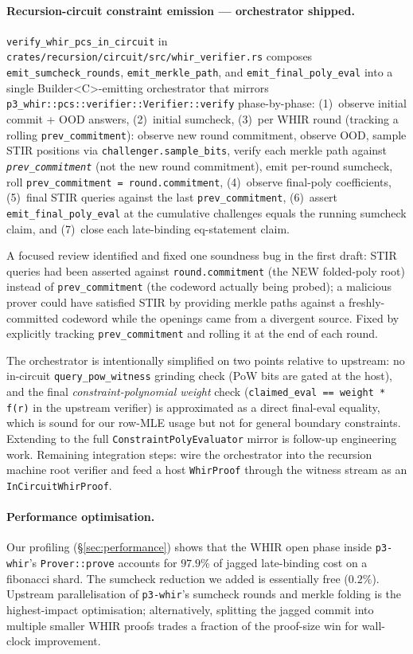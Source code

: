 \paragraph{Recursion-circuit constraint emission --- orchestrator
shipped.}  \texttt{verify\_whir\_pcs\_in\_circuit} in
\texttt{crates/recursion/circuit/src/whir\_verifier.rs} composes
\texttt{emit\_sumcheck\_rounds}, \texttt{emit\_merkle\_path}, and
\texttt{emit\_final\_poly\_eval} into a single Builder<C>-emitting
orchestrator that mirrors
\texttt{p3\_whir::pcs::verifier::Verifier::verify} phase-by-phase:
(1)~observe initial commit + OOD answers,
(2)~initial sumcheck,
(3)~per WHIR round (tracking a rolling \texttt{prev\_commitment}):
observe new round commitment, observe OOD, sample STIR positions
via \texttt{challenger.sample\_bits}, verify each merkle path
against \emph{\texttt{prev\_commitment}} (not the new round
commitment), emit per-round sumcheck, roll \texttt{prev\_commitment
= round.commitment},
(4)~observe final-poly coefficients,
(5)~final STIR queries against the last \texttt{prev\_commitment},
(6)~assert \texttt{emit\_final\_poly\_eval} at the cumulative
challenges equals the running sumcheck claim, and
(7)~close each late-binding eq-statement claim.

A focused review identified and fixed one soundness bug in the
first draft: STIR queries had been asserted against
\texttt{round.commitment} (the NEW folded-poly root) instead of
\texttt{prev\_commitment} (the codeword actually being probed); a
malicious prover could have satisfied STIR by providing merkle
paths against a freshly-committed codeword while the openings came
from a divergent source.  Fixed by explicitly tracking
\texttt{prev\_commitment} and rolling it at the end of each round.

The orchestrator is intentionally simplified on two points relative
to upstream: no in-circuit \texttt{query\_pow\_witness} grinding
check (PoW bits are gated at the host), and the final
\emph{constraint-polynomial weight} check (\texttt{claimed\_eval
== weight * f(r)} in the upstream verifier) is approximated as a
direct final-eval equality, which is sound for our row-MLE usage
but not for general boundary constraints.  Extending to the full
\texttt{ConstraintPolyEvaluator} mirror is follow-up engineering
work.  Remaining integration steps: wire the orchestrator into the
recursion machine root verifier and feed a host \texttt{WhirProof}
through the witness stream as an \texttt{InCircuitWhirProof}.

\paragraph{Performance optimisation.}  Our profiling
(\S\ref{sec:performance}) shows that the WHIR open phase inside
\texttt{p3-whir}'s \texttt{Prover::prove} accounts for $97.9\%$
of jagged late-binding cost on a fibonacci shard.  The sumcheck
reduction we added is essentially free ($0.2\%$).  Upstream
parallelisation of \texttt{p3-whir}'s sumcheck rounds and merkle
folding is the highest-impact optimisation; alternatively,
splitting the jagged commit into multiple smaller WHIR proofs
trades a fraction of the proof-size win for wall-clock improvement.

